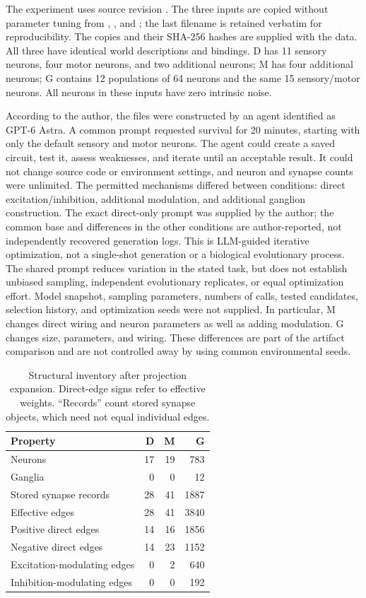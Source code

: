 \documentclass[11pt]{article}
\begin{document}
The experiment uses source revision . The three inputs are copied without parameter tuning from , , and ; the last filename is retained verbatim for reproducibility. The copies and their SHA-256 hashes are supplied with the data. All three have identical world descriptions and bindings. D has 11 sensory neurons, four motor neurons, and two additional neurons; M has four additional neurons; G contains 12 populations of 64 neurons and the same 15 sensory/motor neurons. All neurons in these inputs have zero intrinsic noise.

According to the author, the files were constructed by an agent identified as GPT-6 Astra. A common prompt requested survival for 20 minutes, starting with only the default sensory and motor neurons. The agent could create a saved circuit, test it, assess weaknesses, and iterate until an acceptable result. It could not change source code or environment settings, and neuron and synapse counts were unlimited. The permitted mechanisms differed between conditions: direct excitation/inhibition, additional modulation, and additional ganglion construction. The exact direct-only prompt was supplied by the author; the common base and differences in the other conditions are author-reported, not independently recovered generation logs. This is LLM-guided iterative optimization, not a single-shot generation or a biological evolutionary process. The shared prompt reduces variation in the stated task, but does not establish unbiased sampling, independent evolutionary replicates, or equal optimization effort. Model snapshot, sampling parameters, numbers of calls, tested candidates, selection history, and optimization seeds were not supplied. In particular, M changes direct wiring and neuron parameters as well as adding modulation. G changes size, parameters, and wiring. These differences are part of the artifact comparison and are not controlled away by using common environmental seeds.

\begin{table}[tbp]\centering\small
\caption{Structural inventory after projection expansion. Direct-edge signs refer to effective weights. ``Records'' count stored synapse objects, which need not equal individual edges.}\label{tab:structure}
\begin{tabular}{lrrr}\toprule
Property & D & M & G\\\midrule
Neurons &17&19&783\\
Ganglia &0&0&12\\
Stored synapse records &28&41&1887\\
Effective edges &28&41&3840\\
Positive direct edges &14&16&1856\\
Negative direct edges &14&23&1152\\
Excitation-modulating edges &0&2&640\\
Inhibition-modulating edges &0&0&192\\\bottomrule
\end{tabular}
\end{table}
\end{document}
